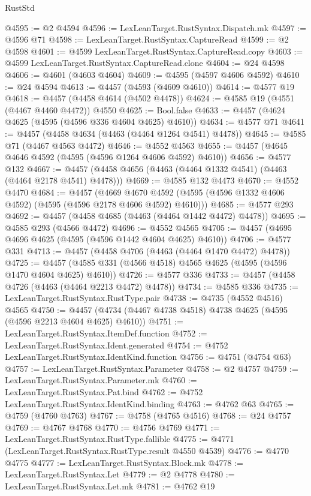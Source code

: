 \begin{lexlean}{RustStd}
\begin{coremodule}
@4595 := @2 @4594
@4596 := LexLeanTarget.RustSyntax.Dispatch.mk
@4597 := @4596 @71
@4598 := LexLeanTarget.RustSyntax.CaptureRead
@4599 := @2 @4598
@4601 := @4599 LexLeanTarget.RustSyntax.CaptureRead.copy
@4603 := @4599 LexLeanTarget.RustSyntax.CaptureRead.clone
@4604 := @24 @4598
@4606 := @4601 (@4603 @4604)
@4609 := @4595 (@4597 @4606 @4592)
@4610 := @24 @4594
@4613 := @4457 (@4593 (@4609 @4610))
@4614 := @4577 @19
@4618 := @4457 (@4458 @4614 (@4502 @4478))
@4624 := @4585 @19 (@4551 (@4467 @4460 @4472)) @4550
@4625 := Bool.false
@4633 := @4457 (@4624 @4625 (@4595 (@4596 @336 @4604 @4625) @4610))
@4634 := @4577 @71
@4641 := @4457 (@4458 @4634 (@4463 (@4464 @1264 @4541) @4478))
@4645 := @4585 @71 (@4467 @4563 @4472)
@4646 := @4552 @4563
@4655 := @4457 (@4645 @4646 @4592 (@4595 (@4596 @1264 @4606 @4592) @4610))
@4656 := @4577 @132
@4667 := @4457 (@4458 @4656 (@4463 (@4464 @1332 @4541) (@4463 (@4464 @2178 @4541) @4478)))
@4669 := @4585 @132 @4473
@4670 := @4552 @4470
@4684 := @4457
    (@4669 @4670 @4592 (@4595 (@4596 @1332 @4606 @4592) (@4595 (@4596 @2178 @4606 @4592) @4610)))
@4685 := @4577 @293
@4692 := @4457 (@4458 @4685 (@4463 (@4464 @1442 @4472) @4478))
@4695 := @4585 @293 (@4566 @4472)
@4696 := @4552 @4565
@4705 := @4457 (@4695 @4696 @4625 (@4595 (@4596 @1442 @4604 @4625) @4610))
@4706 := @4577 @331
@4713 := @4457 (@4458 @4706 (@4463 (@4464 @1470 @4472) @4478))
@4725 := @4457 (@4585 @331 (@4566 @4518) @4565 @4625 (@4595 (@4596 @1470 @4604 @4625) @4610))
@4726 := @4577 @336
@4733 := @4457 (@4458 @4726 (@4463 (@4464 @2213 @4472) @4478))
@4734 := @4585 @336
@4735 := LexLeanTarget.RustSyntax.RustType.pair
@4738 := @4735 (@4552 @4516) @4565
@4750 := @4457 (@4734 (@4467 @4738 @4518) @4738 @4625 (@4595 (@4596 @2213 @4604 @4625) @4610))
@4751 := LexLeanTarget.RustSyntax.ItemDef.function
@4752 := LexLeanTarget.RustSyntax.Ident.generated
@4754 := @4752 LexLeanTarget.RustSyntax.IdentKind.function
@4756 := @4751 (@4754 @63)
@4757 := LexLeanTarget.RustSyntax.Parameter
@4758 := @2 @4757
@4759 := LexLeanTarget.RustSyntax.Parameter.mk
@4760 := LexLeanTarget.RustSyntax.Pat.bind
@4762 := @4752 LexLeanTarget.RustSyntax.IdentKind.binding
@4763 := @4762 @63
@4765 := @4759 (@4760 @4763)
@4767 := @4758 (@4765 @4516)
@4768 := @24 @4757
@4769 := @4767 @4768
@4770 := @4756 @4769
@4771 := LexLeanTarget.RustSyntax.RustType.fallible
@4775 := @4771 (LexLeanTarget.RustSyntax.RustType.result @4550 @4539)
@4776 := @4770 @4775
@4777 := LexLeanTarget.RustSyntax.Block.mk
@4778 := LexLeanTarget.RustSyntax.Let
@4779 := @2 @4778
@4780 := LexLeanTarget.RustSyntax.Let.mk
@4781 := @4762 @19

\end{coremodule}
\end{lexlean}
